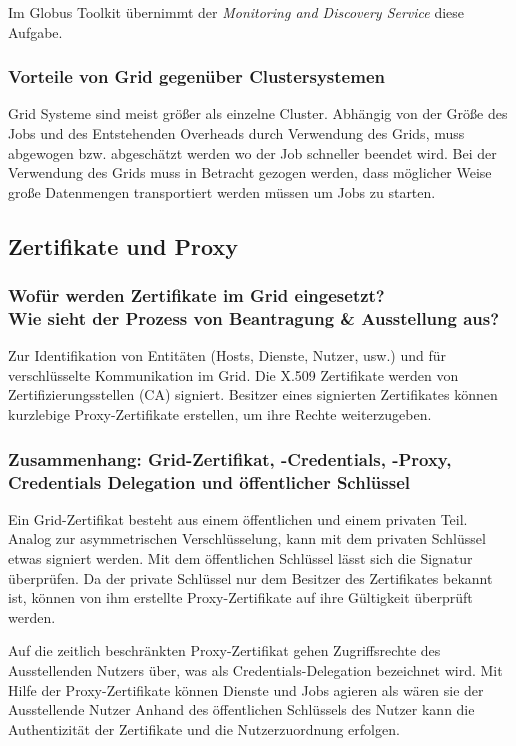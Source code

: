 		Im Globus Toolkit übernimmt der \textsl{Monitoring and Discovery Service} diese 
		Aufgabe.
		
	\subsubsection{Vorteile von Grid gegenüber Clustersystemen}
		Grid Systeme sind meist größer als einzelne Cluster.
		Abhängig von der Größe des Jobs und des Entstehenden Overheads
		durch Verwendung des Grids,
		muss abgewogen bzw. abgeschätzt werden wo der Job schneller beendet wird.
		Bei der Verwendung des Grids muss in Betracht gezogen werden,
		dass möglicher Weise große Datenmengen transportiert werden müssen
		um Jobs zu starten.

\subsection{Zertifikate und Proxy}
	\subsubsection{Wofür werden Zertifikate im Grid eingesetzt?\\
	Wie sieht der Prozess von Beantragung \& Ausstellung aus?}
		Zur Identifikation von Entitäten (Hosts, Dienste, Nutzer, usw.) 
		und für verschlüsselte Kommunikation im Grid.
		Die X.509 Zertifikate werden von Zertifizierungsstellen (CA) signiert.
		Besitzer eines signierten Zertifikates können kurzlebige Proxy-Zertifikate erstellen,
		um ihre Rechte weiterzugeben.
		
	\subsubsection{Zusammenhang: Grid-Zertifikat, -Credentials, -Proxy, Credentials Delegation und öffentlicher Schlüssel}
		Ein Grid-Zertifikat besteht aus einem öffentlichen und einem privaten Teil.
		Analog zur asymmetrischen Verschlüsselung,
		kann mit dem privaten Schlüssel etwas signiert werden.
		Mit dem öffentlichen Schlüssel lässt sich die Signatur überprüfen.
		Da der private Schlüssel nur dem Besitzer des Zertifikates bekannt ist,
		können von ihm erstellte Proxy-Zertifikate auf ihre Gültigkeit überprüft werden.
		
		Auf die zeitlich beschränkten Proxy-Zertifikat gehen Zugriffsrechte des Ausstellenden Nutzers über,
		was als Credentials-Delegation bezeichnet wird.
		Mit Hilfe der Proxy-Zertifikate können Dienste und Jobs agieren
		als wären sie der Ausstellende Nutzer
		Anhand des öffentlichen Schlüssels des Nutzer kann die Authentizität 
		der Zertifikate und die Nutzerzuordnung erfolgen.

